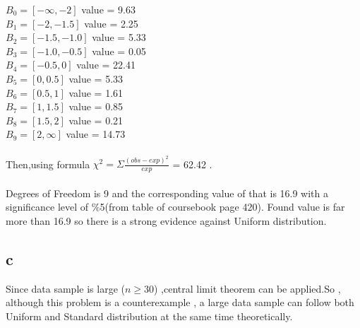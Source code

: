 \documentclass[11pt]{article}
\begin{document}
$B_0=[-\infty,-2]$ value = 9.63\\

$B_1=[-2,-1.5]$ value = 2.25\\

$B_2=[-1.5,-1.0]$ value = 5.33\\

$B_3=[-1.0,-0.5]$ value = 0.05\\

$B_4=[-0.5,0]$ value = 22.41\\

$B_5=[0,0.5]$ value = 5.33\\

$B_6=[0.5,1]$ value = 1.61\\

$B_7=[1,1.5]$ value = 0.85\\

$B_8=[1.5,2]$ value = 0.21\\

$B_9=[2,\infty]$ value = 14.73\\\\

Then,using formula $\chi^2 = \Sigma \frac{{(obs -exp)}^2}{exp}$ = 62.42 .\\\\
Degrees of Freedom is 9  and the corresponding value of that is 16.9 with a significance level of \%5(from table of coursebook page 420). Found value is far more than 16.9 so there is a strong evidence against Uniform distribution.

\subsection*{c}

Since data sample is large ($n \geq 30 $) ,central limit theorem can be applied.So , although this problem is a counterexample , a large data sample can follow both Uniform and Standard distribution at the same time theoretically.\\
\end{document}

